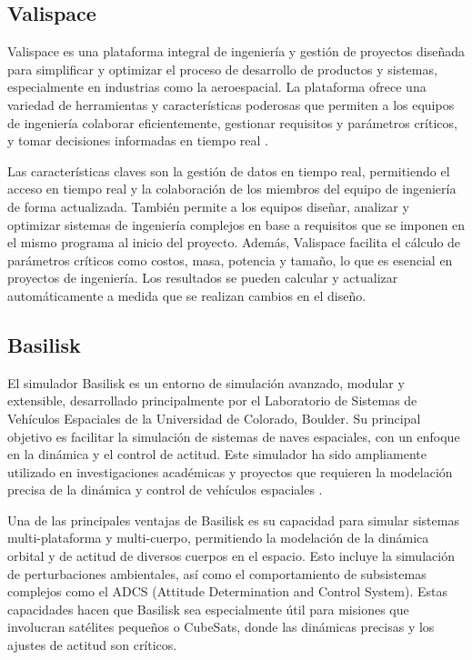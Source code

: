 \subsection{Valispace}

Valispace es una plataforma integral de ingeniería y gestión de proyectos diseñada para simplificar y optimizar el proceso de desarrollo de productos y sistemas, especialmente en industrias como la aeroespacial. La plataforma ofrece una variedad de herramientas y características poderosas que permiten a los equipos de ingeniería colaborar eficientemente, gestionar requisitos y parámetros críticos, y tomar decisiones informadas en tiempo real \cite{ref35}.

Las características claves son la gestión de datos en tiempo real, permitiendo el acceso en tiempo real y la colaboración de los miembros del equipo de ingeniería de forma actualizada. También permite a los equipos diseñar, analizar y optimizar sistemas de ingeniería complejos en base a requisitos que se imponen en el mismo programa al inicio del proyecto. Además, Valispace facilita el cálculo de parámetros críticos como costos, masa, potencia y tamaño, lo que es esencial en proyectos de ingeniería. Los resultados se pueden calcular y actualizar automáticamente a medida que se realizan cambios en el diseño.

\subsection{Basilisk}

El simulador Basilisk es un entorno de simulación avanzado, modular y extensible, desarrollado principalmente por el Laboratorio de Sistemas de Vehículos Espaciales de la Universidad de Colorado, Boulder. Su principal objetivo es facilitar la simulación de sistemas de naves espaciales, con un enfoque en la dinámica y el control de actitud. Este simulador ha sido ampliamente utilizado en investigaciones académicas y proyectos que requieren la modelación precisa de la dinámica y control de vehículos espaciales \cite{ref36}.

Una de las principales ventajas de Basilisk es su capacidad para simular sistemas multi-plataforma y multi-cuerpo, permitiendo la modelación de la dinámica orbital y de actitud de diversos cuerpos en el espacio. Esto incluye la simulación de perturbaciones ambientales, así como el comportamiento de subsistemas complejos como el ADCS (Attitude Determination and Control System). Estas capacidades hacen que Basilisk sea especialmente útil para misiones que involucran satélites pequeños o CubeSats, donde las dinámicas precisas y los ajustes de actitud son críticos.

